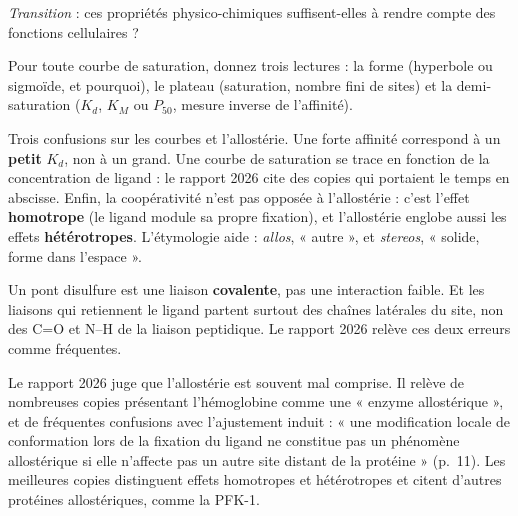 \documentclass[11pt,a4paper]{article}
\begin{document}
\emph{Transition} : ces propriétés physico-chimiques suffisent-elles à rendre compte des fonctions cellulaires ?

\begin{methode}

Pour toute courbe de saturation, donnez trois lectures : la forme (hyperbole ou sigmoïde, et pourquoi), le plateau (saturation, nombre fini de sites) et la demi-saturation (\(K_d\), \(K_M\) ou \(P_{50}\), mesure inverse de l'affinité).

\end{methode}

\begin{piege}

Trois confusions sur les courbes et l'allostérie. Une forte affinité correspond à un \textbf{petit} \(K_d\), non à un grand. Une courbe de saturation se trace en fonction de la concentration de ligand : le rapport 2026 cite des copies qui portaient le temps en abscisse. Enfin, la coopérativité n'est pas opposée à l'allostérie : c'est l'effet \textbf{homotrope} (le ligand module sa propre fixation), et l'allostérie englobe aussi les effets \textbf{hétérotropes}. L'étymologie aide : \emph{allos}, « autre », et \emph{stereos}, « solide, forme dans l'espace ».

\end{piege}

\begin{piege}

Un pont disulfure est une liaison \textbf{covalente}, pas une interaction faible. Et les liaisons qui retiennent le ligand partent surtout des chaînes latérales du site, non des C=O et N--H de la liaison peptidique. Le rapport 2026 relève ces deux erreurs comme fréquentes.

\end{piege}

\begin{jury}

Le rapport 2026 juge que l'allostérie est souvent mal comprise. Il relève de nombreuses copies présentant l'hémoglobine comme une « enzyme allostérique », et de fréquentes confusions avec l'ajustement induit : « une modification locale de conformation lors de la fixation du ligand ne constitue pas un phénomène allostérique si elle n'affecte pas un autre site distant de la protéine » (p.~11). Les meilleures copies distinguent effets homotropes et hétérotropes et citent d'autres protéines allostériques, comme la PFK-1.

\end{jury}
\end{document}
